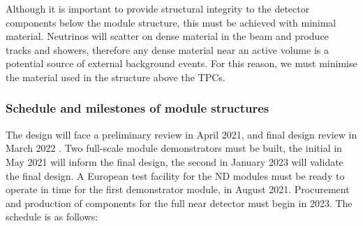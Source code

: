 Although it is important to provide structural integrity to the detector components below the module structure, this must be achieved with minimal material. Neutrinos will scatter on dense material in the beam and produce tracks and showers, therefore any dense material near an active volume is a potential source of external background events. For this reason, we must minimise the material used in the structure above the TPCs.

\subsubsection{Schedule and milestones of module structures}
The design will face a preliminary review in April 2021, and final design review in March 2022 . Two full-scale module demonstrators must be built, the initial in May 2021 will inform the final design, the second in January 2023 will validate the final design. A European test facility for the ND modules must be ready to operate in time for the first demonstrator module, in August 2021. Procurement and production of components for the full near detector must begin in 2023. The schedule is as follows:
